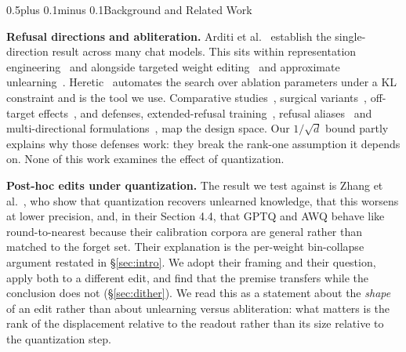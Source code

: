 \documentclass[conference,compsoc,letterpaper]{IEEEtran}
\makeatletter
\def\section{\@startsection{section}{1}{\z@}{1\baselineskip plus 0.25\baselineskip minus 0.25\baselineskip}%
{0.5\baselineskip plus 0.1\baselineskip minus 0.1\baselineskip}{\normalfont\large\bfseries}}%
\makeatother
\begin{document}
\section{Background and Related Work}

\textbf{Refusal directions and abliteration.} Arditi et al.~\cite{arditi2024refusal} establish the single-direction result across many chat models. This sits within representation engineering~\cite{repe2023} and alongside targeted weight editing~\cite{rome2022,memit2023} and approximate unlearning~\cite{unlearn2023}. Heretic~\cite{heretic2025} automates the search over ablation parameters under a KL constraint and is the tool we use. Comparative studies~\cite{abliterationcompare2025}, surgical variants~\cite{surgicalablation2026}, off-target effects~\cite{fafula2026scalpel}, and defenses, extended-refusal training~\cite{defense2025}, refusal aliases~\cite{aliases2026} and multi-directional formulations~\cite{multidir2026}, map the design space. Our $1/\sqrt{d}$ bound partly explains why those defenses work: they break the rank-one assumption it depends on. None of this work examines the effect of quantization.

\textbf{Post-hoc edits under quantization.} The result we test against is Zhang et al.~\cite{zhang2025unlearnquant}, who show that quantization recovers unlearned knowledge, that this worsens at lower precision, and, in their Section 4.4, that GPTQ and AWQ behave like round-to-nearest because their calibration corpora are general rather than matched to the forget set. Their explanation is the per-weight bin-collapse argument restated in \S\ref{sec:intro}. We adopt their framing and their question, apply both to a different edit, and find that the premise transfers while the conclusion does not (\S\ref{sec:dither}). We read this as a statement about the \emph{shape} of an edit rather than about unlearning versus abliteration: what matters is the rank of the displacement relative to the readout rather than its size relative to the quantization step.
\end{document}
